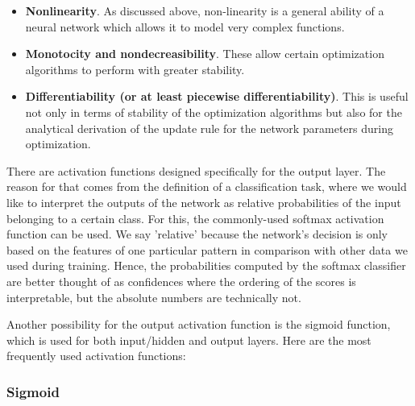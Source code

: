 \begin{itemize}
	
\item \textbf{Nonlinearity}. As discussed above, non-linearity is a general ability of a neural network which allows it to model very complex functions.
\item \textbf{Monotocity and nondecreasibility}. These allow certain optimization algorithms to perform with greater stability.
\item \textbf{Differentiability (or at least piecewise differentiability)}. This is useful not only in terms of stability of the optimization algorithms but also for the analytical derivation of the update rule for the network parameters during optimization. 
		
\end{itemize}

There are activation functions designed specifically for the output layer. The reason for that comes from the definition of a classification task, where we would like to interpret the outputs of the network as relative probabilities of the input belonging to a certain class. For this, the commonly-used softmax activation function can be used. We say 'relative' because the network's decision is only based on the features of one particular pattern in comparison with other data we used during training. Hence, the probabilities computed by the softmax classifier are better thought of as confidences where the ordering of the scores is interpretable, but the absolute numbers are technically not. \cite{stanford-github}

Another possibility for the output activation function is the sigmoid function, which is used for both input/hidden and output layers. Here are the most frequently used activation functions: \cite{groman}

\subsubsection{Sigmoid}
\vspace{5mm}

